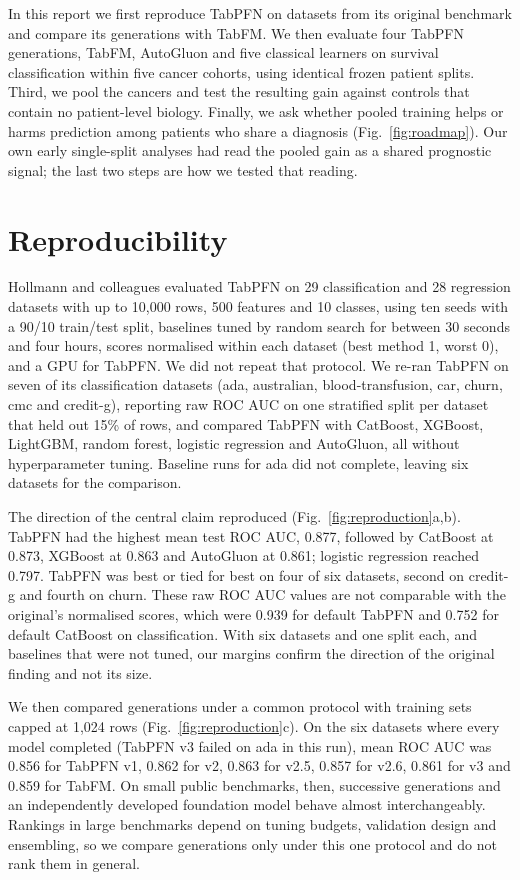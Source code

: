 \documentclass[pdflatex,sn-nature]{sn-jnl}
\begin{document}
In this report we first reproduce TabPFN on datasets from its original benchmark and compare its generations with TabFM. We then evaluate four TabPFN generations, TabFM, AutoGluon and five classical learners on survival classification within five cancer cohorts, using identical frozen patient splits. Third, we pool the cancers and test the resulting gain against controls that contain no patient-level biology. Finally, we ask whether pooled training helps or harms prediction among patients who share a diagnosis (Fig.~\ref{fig:roadmap}). Our own early single-split analyses had read the pooled gain as a shared prognostic signal; the last two steps are how we tested that reading.



\section*{Reproducibility}

Hollmann and colleagues evaluated TabPFN on 29 classification and 28 regression datasets with up to 10,000 rows, 500 features and 10 classes, using ten seeds with a 90/10 train/test split, baselines tuned by random search for between 30 seconds and four hours, scores normalised within each dataset (best method 1, worst 0), and a GPU for TabPFN.\citep{hollmann2025accurate} We did not repeat that protocol. We re-ran TabPFN on seven of its classification datasets (ada, australian, blood-transfusion, car, churn, cmc and credit-g), reporting raw ROC AUC on one stratified split per dataset that held out 15\% of rows, and compared TabPFN with CatBoost, XGBoost, LightGBM, random forest, logistic regression and AutoGluon, all without hyperparameter tuning. Baseline runs for ada did not complete, leaving six datasets for the comparison.

The direction of the central claim reproduced (Fig.~\ref{fig:reproduction}a,b). TabPFN had the highest mean test ROC AUC, 0.877, followed by CatBoost at 0.873, XGBoost at 0.863 and AutoGluon at 0.861; logistic regression reached 0.797. TabPFN was best or tied for best on four of six datasets, second on credit-g and fourth on churn. These raw ROC AUC values are not comparable with the original's normalised scores, which were 0.939 for default TabPFN and 0.752 for default CatBoost on classification.\citep{hollmann2025accurate} With six datasets and one split each, and baselines that were not tuned, our margins confirm the direction of the original finding and not its size.

We then compared generations under a common protocol with training sets capped at 1,024 rows (Fig.~\ref{fig:reproduction}c). On the six datasets where every model completed (TabPFN v3 failed on ada in this run), mean ROC AUC was 0.856 for TabPFN v1, 0.862 for v2, 0.863 for v2.5, 0.857 for v2.6, 0.861 for v3 and 0.859 for TabFM. On small public benchmarks, then, successive generations and an independently developed foundation model behave almost interchangeably. Rankings in large benchmarks depend on tuning budgets, validation design and ensembling,\citep{erickson2025tabarena,qu2025tabicl} so we compare generations only under this one protocol and do not rank them in general.
\end{document}
